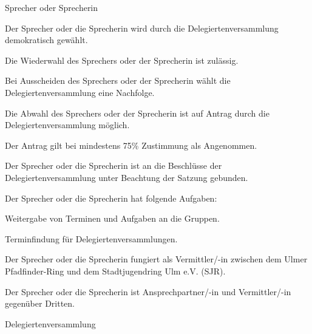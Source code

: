 \begin{legal}
\begin{legal}
\begin{legal}
                \end{legal}
        \end{legal}
    \item Sprecher oder Sprecherin
        \begin{legal}
            \item Der Sprecher oder die Sprecherin wird durch die Delegiertenversammlung 
                  demokratisch gewählt.
            \item Die Wiederwahl des Sprechers oder der Sprecherin ist zulässig.
            \item Bei Ausscheiden des Sprechers oder der Sprecherin wählt die Delegiertenversammlung 
                  eine Nachfolge.
            \item Die Abwahl des Sprechers oder der Sprecherin ist auf Antrag durch die 
                  Delegiertenversammlung möglich.
                \begin{legal}
                    \item Der Antrag gilt bei mindestens 75\% Zustimmung als Angenommen.
                \end{legal}
            \item Der Sprecher oder die Sprecherin ist an die Beschlüsse der Delegiertenversammlung 
                  unter Beachtung der Satzung gebunden.
            \item Der Sprecher oder die Sprecherin hat folgende Aufgaben:
                  \begin{legal}
                        \item Weitergabe von Terminen und Aufgaben an die Gruppen.
                        \item Terminfindung für Delegiertenversammlungen.
                  \end{legal}
            \item Der Sprecher oder die Sprecherin fungiert als Vermittler/-in zwischen dem Ulmer 
                  Pfadfinder-Ring und dem Stadtjugendring Ulm e.V. (SJR).
            \item Der Sprecher oder die Sprecherin ist Ansprechpartner/-in und Vermittler/-in 
                  gegenüber Dritten.
        \end{legal}
    \item Delegiertenversammlung
        \begin{legal}

\end{legal}
\end{legal}
